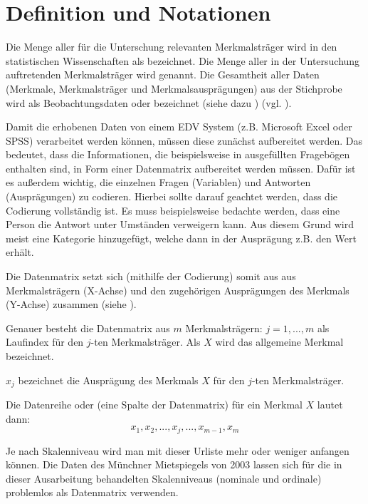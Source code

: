 \section{Definition und Notationen}\label{sec:defNot}
Die Menge aller für die Unterschung relevanten Merkmalsträger wird in den statistischen
Wissenschaften als  bezeichnet. Die Menge aller in der Untersuchung auftretenden
Merkmalsträger wird  genannt. Die Gesamtheit aller Daten (Merkmale, Merkmalsträger
und Merkmalsausprägungen) aus der Stichprobe wird als Beobachtungsdaten oder  bezeichnet
(siehe dazu ) (vgl. ).

 
Damit die erhobenen Daten von einem EDV System (z.B. Microsoft Excel oder SPSS) verarbeitet werden
können, müssen diese zunächst aufbereitet werden. Das bedeutet, dass die Informationen, die
beispielsweise in ausgefüllten Fragebögen enthalten sind, in Form einer Datenmatrix aufbereitet
werden müssen. Dafür ist es außerdem wichtig, die einzelnen Fragen (Variablen) und Antworten
(Ausprägungen) zu codieren. Hierbei sollte darauf geachtet werden, dass die Codierung vollständig
ist. Es muss beispielsweise bedachte werden, dass eine Person die Antwort unter Umständen
verweigern kann. Aus diesem Grund wird meist eine Kategorie  hinzugefügt, welche
dann in der Ausprägung z.B. den Wert  erhält. 

Die Datenmatrix setzt sich (mithilfe der Codierung) somit aus aus Merkmalsträgern (X-Achse) und
den zugehörigen Ausprägungen des Merkmals (Y-Achse) zusammen (siehe
).


Genauer besteht die Datenmatrix aus $m$ Merkmalsträgern: $j=1,...,m$ als Laufindex für den
$j$-ten Merkmalsträger. Als $X$ wird das allgemeine Merkmal bezeichnet.

$x_j$ bezeichnet die Ausprägung des Merkmals $X$ für den $j$-ten
Merkmalsträger. 

Die Datenreihe oder  (eine Spalte der Datenmatrix) für ein Merkmal $X$
lautet dann: \[x_1, x_2 ,..., x_j ,..., x_{m-1},x_m\]

Je nach Skalenniveau wird man mit dieser Urliste mehr oder weniger anfangen können. Die
Daten des Münchner Mietspiegels von 2003 lassen sich für die in dieser Ausarbeitung
behandelten Skalenniveaus (nominale und ordinale) problemlos als Datenmatrix verwenden.


